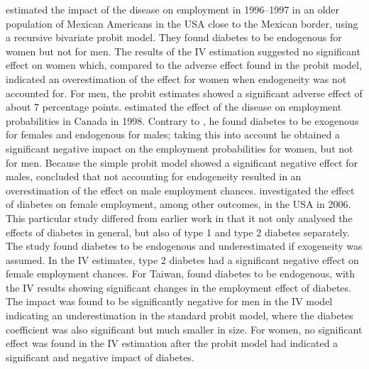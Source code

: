 \textcite{Brown2005} estimated the impact of the disease on
employment in 1996--1997 in an older population of Mexican Americans
in the USA close to the Mexican border, using a recursive bivariate
probit model. They found diabetes to be endogenous for women but not
for men. The results of the \ac{IV} estimation suggested no significant
effect on women which, compared to the adverse effect found in the
probit model, indicated an overestimation of the effect for women
when endogeneity was not accounted for. For men, the probit estimates
showed a significant adverse effect of about 7 percentage points.
\textcite{Latif2009} estimated the effect of the disease on employment
probabilities in Canada in 1998. Contrary to \textcite{Brown2005}, he
found diabetes to be exogenous for females and endogenous for males;
taking this into account he obtained a significant negative impact
on the employment probabilities for women, but not for men. Because
the simple probit model showed a significant negative effect for males,
\textcite{Latif2009} concluded that not accounting for endogeneity resulted
in an overestimation of the effect on male employment chances. \textcite{Minor2011}
investigated the effect of diabetes on female employment, among other
outcomes, in the USA in 2006. This particular study differed
from earlier work in that it not only analysed the effects of diabetes
in general, but also of type 1 and type 2 diabetes separately. The
study found diabetes to be endogenous and underestimated if exogeneity
was assumed. In the \ac{IV} estimates, type 2 diabetes had a significant
negative effect on female employment chances. For Taiwan, \textcite{Lin2011b}
found diabetes to be endogenous, with the \ac{IV} results showing
significant changes in the employment effect of diabetes. The impact
was found to be significantly negative for men in the \ac{IV} model
indicating an underestimation in the standard probit model, where
the diabetes coefficient was also significant but much smaller in
size. For women, no significant effect was found in the \ac{IV} estimation
after the probit model had indicated a significant and negative impact
of diabetes. 

